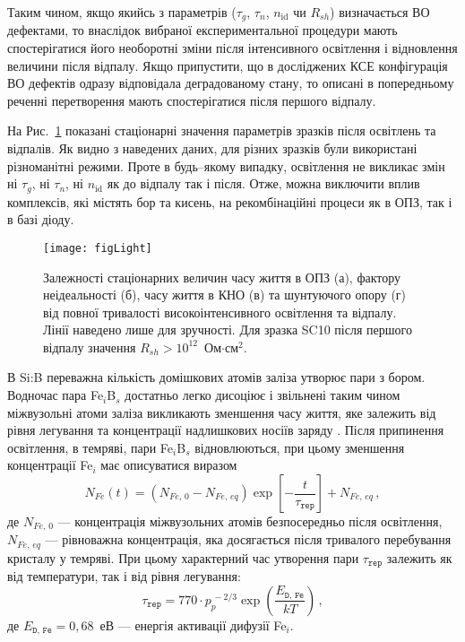 Таким чином, якщо якийсь з параметрів ($\tau_g$, $\tau_n$, $n_{\mathrm{id}}$ чи $R_{sh}$) визначається ВО дефектами,
то внаслідок вибраної експериментальної процедури мають спостерігатися його необоротні зміни після інтенсивного освітлення і відновлення
величини після відпалу.
Якщо припустити, що в досліджених КСЕ конфігурація ВО дефектів одразу відповідала деградованому стану,
то описані в попередньому реченні перетворення мають спостерігатися після першого відпалу.

На Рис.~\ref{figLight} показані стаціонарні значення параметрів зразків після освітлень та відпалів.
Як видно з наведених даних, для різних зразків були використані різноманітні режими.
Проте в будь--якому випадку, освітлення не викликає змін ні $\tau_g$, ні $\tau_n$, ні $n_{\mathrm{id}}$ як до
відпалу так і після.
Отже, можна виключити вплив комплексів, які містять бор та кисень, на рекомбінаційні процеси
як в ОПЗ, так і в базі діоду.

\begin{figure}
\center
\texttt{[image: figLight]}
\caption{\label{figLight}
Залежності стаціонарних величин часу життя в ОПЗ (а),  фактору неідеальності (б), часу життя в КНО (в) та шунтуючого опору (г) від
повної тривалості високоінтенсивного освітлення та відпалу.
Лінії наведено лише для зручності.
Для зразка SC10 після першого відпалу значення $R_{sh}>10^{12}$~Ом$\cdot$см$^2$.
}%
\end{figure}


В Si:B переважна кількість домішкових атомів заліза утворює пари з бором.
Водночас пара Fe$_i$B$_s$ достатньо легко дисоціює і звільнені таким чином міжвузольні атоми заліза
викликають зменшення часу життя, яке залежить від рівня легування та концентрації надлишкових носіїв заряду \cite{FeB:Schmidt}.
Після припинення освітлення, в темряві, пари Fe$_i$B$_s$ відновлюються, при цьому
зменшення концентрації Fe$_i$ має описуватися виразом \cite{MurphyJAP2011,Wijaranakula}
\begin{equation}
\label{eqFeB}
N_{Fe}(t)=(N_{Fe,\,0}-N_{Fe,\,eq})\exp\left[-\frac{t}{\tau_{\mathtt{rep}}}\right]+N_{Fe,\,eq}\,,
\end{equation}
де
$N_{Fe,\,0}$ --- концентрація міжвузольних атомів безпосередньо після освітлення,
$N_{Fe,\,eq}$ --- рівноважна концентрація, яка досягається після тривалого перебування кристалу у темряві.
При цьому характерний час утворення пари $\tau_{\mathtt{rep}}$ залежить як від температури, так і від
рівня легування:
\begin{equation}
\label{eqTrep}
\tau_{\mathtt{rep}}=770\cdot p_p^{\,-2/3}\exp\left(\frac{E_{\mathtt{D,\,Fe}}}{kT}\right)\,,
\end{equation}
де
$E_{\mathtt{D,\,Fe}}=0,68$~еВ --- енергія активації дифузії Fe$_i$.


